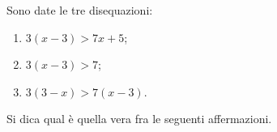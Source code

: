 Sono date le tre disequazioni: 
\begin{enumerate}
\item
$3 (x-3) > 7x +5$;
\item
$3 (x-3) > 7$;
\item
$3 (3-x) > 7(x-3)$.
\end{enumerate}
Si dica qual è quella vera fra le seguenti affermazioni.
